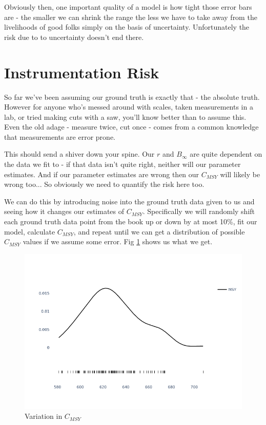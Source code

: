 \documentclass[11pt,a5paper]{book}
\begin{document}
Obviously then, one important quality of a model is how tight those error bars are - the smaller we can shrink the range the less we have to take away from the livelihoods of good folks simply on the basis of uncertainty. Unfortunately the risk due to to uncertainty doesn't end there. 

\section{Instrumentation Risk}

So far we've been assuming our ground truth is exactly that - the absolute truth. However for anyone who's messed around with scales, taken measurements in a lab, or tried making cuts with a saw, you'll know better than to assume this. Even the old adage - measure twice, cut once - comes from a common knowledge that measurements are error prone. 
\newline

This should send a shiver down your spine. Our $r$ and $B_\infty$ are quite dependent on the data we fit to - if that data isn't quite right, neither will our parameter estimates. And if our parameter estimates are wrong then our $C_{MSY}$ will likely be wrong too... So obviously we need to quantify the risk here too. 
\newline

We can do this by introducing noise into the ground truth data given to us and seeing how it changes our estimates of $C_{MSY}$. Specifically we will randomly shift each ground truth data point from the book up or down by at most 10\%, fit our model, calculate $C_{MSY}$, and repeat until we can get a distribution of possible $C_{MSY}$ values if we assume some error. Fig \ref{fig:instrumentation_error} shows us what we get.
\newline

\begin{figure}[h!] 
  \includegraphics[width=\linewidth]{notebooks/SurplusModels/instrumentation.png}
  \caption{Variation in $C_{MSY}$}
  \label{fig:instrumentation_error}
\end{figure}
\end{document}
